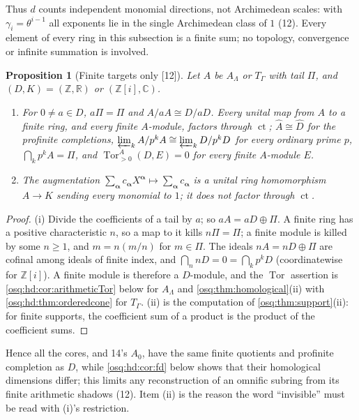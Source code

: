 \documentclass[11pt,letterpaper]{article}
\numberwithin{equation}{section}
\newtheorem{proposition}[proposition]{Proposition}
\theoremstyle{definition}
\theoremstyle{remark}
\theoremstyle{plain}
\newcommand{\Z}{\mathbb Z}
\newcommand{\R}{\mathbb R}
\newcommand{\C}{\mathbb C}
\newcommand{\ct}{\operatorname{ct}}
\newcommand{\Tor}{\operatorname{Tor}}
\newcommand{\src}[1]{\textup{\textsf{[#1]}}}
\begin{document}
Thus $d$ counts independent monomial directions, not Archimedean scales: with $\gamma_i=\theta^{i-1}$ all exponents lie
in the single Archimedean class of $1$ (12). Every element of every ring in this subsection is a finite sum; no
topology, convergence or infinite summation is involved.

\begin{proposition}[Finite targets only \src{12}]\label{osq:hd:prop:finite}
Let $A$ be $A_\Lambda$ or $T_\Gamma$ with tail $\Pi$, and $(D,K)=(\Z,\R)$ or $(\Z[i],\C)$.
\begin{enumerate}
\item For $0\ne a\in D$, $a\Pi=\Pi$ and $A/aA\cong D/aD$. Every unital map from $A$ to a finite ring, and every
finite $A$-module, factors through $\ct$; $\widehat A\cong\widehat D$ for the profinite completions,
$\varprojlim_kA/p^kA\cong\varprojlim_kD/p^kD$ for every ordinary prime $p$, $\bigcap_kp^kA=\Pi$, and
$\Tor^A_{>0}(D,E)=0$ for every finite $A$-module $E$.
\item The augmentation $\sum_{\boldsymbol\alpha}c_{\boldsymbol\alpha}X^{\boldsymbol\alpha}\mapsto\sum_{\boldsymbol\alpha}c_{\boldsymbol\alpha}$
is a unital ring homomorphism $A\to K$ sending every monomial to $1$; it does not factor through $\ct$.
\end{enumerate}
\end{proposition}
\begin{proof}
(i) Divide the coefficients of a tail by $a$; so $aA=aD\oplus\Pi$. A finite ring has a positive characteristic $n$,
so a map to it kills $n\Pi=\Pi$; a finite module is killed by some $n\ge1$, and $m=n(m/n)$ for $m\in\Pi$. The ideals
$nA=nD\oplus\Pi$ are cofinal among ideals of finite index, and $\bigcap_nnD=0=\bigcap_kp^kD$ (coordinatewise for
$\Z[i]$). A finite module is therefore a $D$-module, and the $\Tor$ assertion is \cref{osq:hd:cor:arithmeticTor} below for
$A_\Lambda$ and \cref{osq:thm:homological}(ii) with \cref{osq:hd:thm:orderedcone} for $T_\Gamma$. (ii) is the computation of
\cref{osq:thm:support}(ii): for finite supports, the coefficient sum of a product is the product of the coefficient
sums.
\end{proof}

Hence all the cores, and 14's $A_0$, have the same finite quotients and profinite completion as $D$, while
\cref{osq:hd:cor:fd} below shows that their homological dimensions differ; this limits any reconstruction of an
omnific subring from its finite arithmetic shadows (12). Item (ii) is the reason the word ``invisible'' must be read
with (i)'s restriction.
\end{document}
